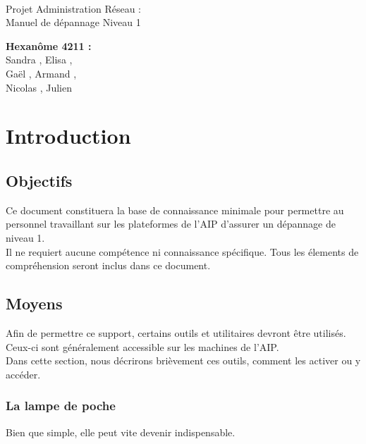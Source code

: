 \documentclass[a4paper]{article}
\begin{document}
\begin{titlepage}
	~ 
	\vfill
	\begin{center}
		\begin{Huge}
			Projet Administration Réseau : \\ Manuel de dépannage Niveau 1\\
		\end{Huge}
	\vfill
		\textbf{Hexanôme 4211 :} 
			\\Sandra {}, Elisa , 
			\\Gaël , Armand , 
			\\Nicolas {}, Julien \\
	\vfill
	\end{center}
	\vfill
\end{titlepage}

\newpage
\tableofcontents
\newpage


\section{Introduction}
\subsection{Objectifs}
Ce document constituera la base de connaissance minimale pour permettre au personnel travaillant sur les plateformes de l'AIP d'assurer un dépannage de niveau 1.\\
Il ne requiert aucune compétence ni connaissance spécifique. Tous les élements de compréhension seront inclus dans ce document.
\subsection{Moyens}
Afin de permettre ce support, certains outils et utilitaires devront être utilisés. Ceux-ci sont généralement accessible sur les machines de l'AIP.\\
Dans cette section, nous décrirons brièvement ces outils, comment les activer ou y accéder.

\subsubsection{La lampe de poche}
Bien que simple, elle peut vite devenir indispensable.
\end{document}
